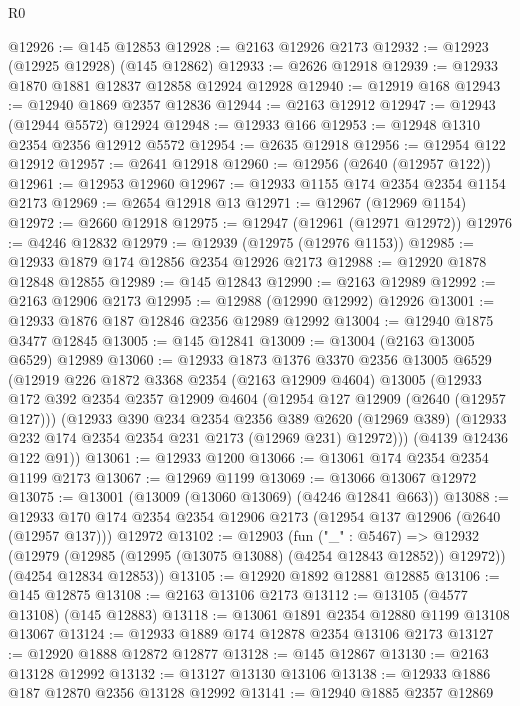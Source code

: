 \begin{lexlean}{R0}
\begin{coremodule}
@12926 := @145 @12853
@12928 := @2163 @12926 @2173
@12932 := @12923 (@12925 @12928) (@145 @12862)
@12933 := @2626 @12918
@12939 := @12933 @1870 @1881 @12837 @12858 @12924 @12928
@12940 := @12919 @168
@12943 := @12940 @1869 @2357 @12836
@12944 := @2163 @12912
@12947 := @12943 (@12944 @5572) @12924
@12948 := @12933 @166
@12953 := @12948 @1310 @2354 @2356 @12912 @5572
@12954 := @2635 @12918
@12956 := @12954 @122 @12912
@12957 := @2641 @12918
@12960 := @12956 (@2640 (@12957 @122))
@12961 := @12953 @12960
@12967 := @12933 @1155 @174 @2354 @2354 @1154 @2173
@12969 := @2654 @12918 @13
@12971 := @12967 (@12969 @1154)
@12972 := @2660 @12918
@12975 := @12947 (@12961 (@12971 @12972))
@12976 := @4246 @12832
@12979 := @12939 (@12975 (@12976 @1153))
@12985 := @12933 @1879 @174 @12856 @2354 @12926 @2173
@12988 := @12920 @1878 @12848 @12855
@12989 := @145 @12843
@12990 := @2163 @12989
@12992 := @2163 @12906 @2173
@12995 := @12988 (@12990 @12992) @12926
@13001 := @12933 @1876 @187 @12846 @2356 @12989 @12992
@13004 := @12940 @1875 @3477 @12845
@13005 := @145 @12841
@13009 := @13004 (@2163 @13005 @6529) @12989
@13060 := @12933
    @1873
    @1376
    @3370
    @2356
    @13005
    @6529
    (@12919
      @226
      @1872
      @3368
      @2354
      (@2163 @12909 @4604)
      @13005
      (@12933
        @172
        @392
        @2354
        @2357
        @12909
        @4604
        (@12954 @127 @12909 (@2640 (@12957 @127)))
        (@12933
          @390
          @234
          @2354
          @2356
          @389
          @2620
          (@12969 @389)
          (@12933 @232 @174 @2354 @2354 @231 @2173 (@12969 @231) @12972)))
      (@4139 @12436 @122 @91))
@13061 := @12933 @1200
@13066 := @13061 @174 @2354 @2354 @1199 @2173
@13067 := @12969 @1199
@13069 := @13066 @13067 @12972
@13075 := @13001 (@13009 (@13060 @13069) (@4246 @12841 @663))
@13088 := @12933
    @170
    @174
    @2354
    @2354
    @12906
    @2173
    (@12954 @137 @12906 (@2640 (@12957 @137)))
    @12972
@13102 := @12903
    (fun ("_" : @5467) =>
    @12932
      (@12979 (@12985 (@12995 (@13075 @13088) (@4254 @12843 @12852)) @12972))
      (@4254 @12834 @12853))
@13105 := @12920 @1892 @12881 @12885
@13106 := @145 @12875
@13108 := @2163 @13106 @2173
@13112 := @13105 (@4577 @13108) (@145 @12883)
@13118 := @13061 @1891 @2354 @12880 @1199 @13108 @13067
@13124 := @12933 @1889 @174 @12878 @2354 @13106 @2173
@13127 := @12920 @1888 @12872 @12877
@13128 := @145 @12867
@13130 := @2163 @13128 @12992
@13132 := @13127 @13130 @13106
@13138 := @12933 @1886 @187 @12870 @2356 @13128 @12992
@13141 := @12940 @1885 @2357 @12869

\end{coremodule}
\end{lexlean}
